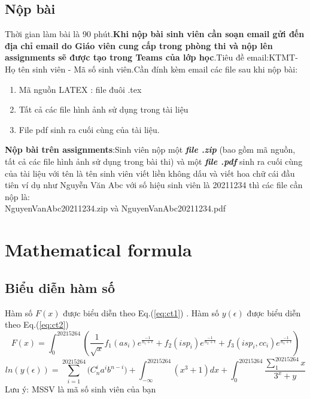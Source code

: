 \documentclass[a4paper,12pt]{article}
\begin{document}
\subsection{Nộp bài}
Thời gian làm bài là 90 phút.\textbf{Khi nộp bài sinh viên cần soạn email gửi đến địa chỉ email do Giáo viên cung cấp trong phòng thi và nộp lên assignments sẽ được tạo trong Teams của lớp học}.Tiêu đề email:KTMT- Họ tên sinh viên - Mã số sinh viên.Cần đính kèm email các file sau khi nộp bài:
\begin{enumerate}
    \item Mã nguồn LATEX : file đuôi .tex
    \item Tất cả các file hình ảnh sử dụng trong tài liệu
    \item File pdf sinh ra cuối cùng của tài liệu.
\end{enumerate}
\textbf{Nộp bài trên assignments}:Sinh viên nộp một \textit{\textbf{file .zip}} (bao gồm mã nguồn, tất cả các file hình ảnh sử dụng trong bài thi) và một \textbf{\textit{file .pdf}} sinh ra cuối cùng của tài liệu với tên là tên sinh viên viết liền không dấu và viết hoa chữ cái đầu tiên ví dụ như Nguyễn Văn Abc với số hiệu sinh viên là 20211234 thì các file cần nộp là:\\
NguyenVanAbc\textunderscore20211234.zip và NguyenVanAbc\textunderscore20211234.pdf 
\\ 


\raggedright

\section{Mathematical formula}
\subsection{Biểu diễn hàm số}
Hàm số $F(x)$ được biểu diễn theo Eq.(\ref{eq:ct1}) . Hàm số $y(\epsilon)$ được biểu diễn theo Eq.(\ref{eq:ct2})
\begin{equation}
    \label{eq:ct1}
    F(x) = {\int_0^{20215264}}\left(\frac{1}{\sqrt{x}}{f_1}(a{s_i}){e^{\frac{-1}{{n_1}+\epsilon}}}+{f_2}(is{p_i}){e^{\frac{-1}{{n_2}+\epsilon}}}+{f_3}(is{p_i},c{c_i}){e^{\frac{-1}{{n_3}+\epsilon}}}\right)
\end{equation}
\begin{equation}
    \label{eq:ct2}
    ln(y(\epsilon))=\sum_{i=1}^{20215264}{(C_n^i}{a^i}{b^{n-i})}+{\int_{-\infty}^{20215264}}(x^3+1)dx+{\int_0^{20215264}}\frac{{\sum^{20215264}_1}x}{3^x+y}
\end{equation}
Lưu ý: MSSV là mã số sinh viên của bạn
\end{document}
